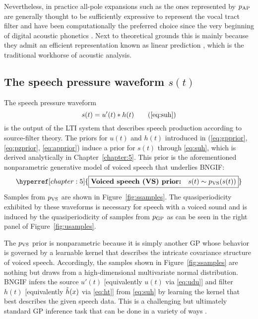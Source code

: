 \begin{chaptersections}
Nevertheless, in practice all-pole expansions such as the ones represented by $p_{\text{AP}}$ are generally thought to be sufficiently expressive to represent the vocal tract filter \citep{Flanagan1965,Fulop2011} and have been computationally the preferred choice since the very beginning of digital acoustic phonetics \citep{Atal1971}.
Next to theoretical grounds \citep{Titze2000} this is mainly because they admit an efficient representation known as linear prediction \citep[LP;][]{Markel1976}, which is the traditional workhorse of acoustic analysis.


\subsection{The speech pressure waveform $s(t)$}


The speech pressure waveform
\begin{equation}
	s(t) = u'(t) * h(t) \tag{\ref{eq:suh}}
\end{equation}
is the output of the LTI system that describes speech production according to source-filter theory.
The priors for $u(t)$ and $h(t)$ introduced in (\ref{eq:gpprior}, \ref{eq:pzprior}, \ref{eq:apprior}) induce a prior for $s(t)$ through \eqref{eq:suh}, which is derived analytically in Chapter~\ref{chapter:5}.
This prior is the aforementioned nonparametric generative model of voiced speech that underlies BNGIF:
\begin{equation}
	\hyperref[chapter:5]{\boxed{\textbf{Voiced speech (VS) prior:} \quad s(t) \sim \piVS(s(t))}} \label{eq:vsprior}
\end{equation}
Samples from $p_{\text{VS}}$ are shown in Figure~\ref{fig:ssamples}.
The quasiperiodicity exhibited by these waveforms is necessary for speech with a voiced sound and is induced by the quasiperiodicity of samples from $p_{\text{GP}}$ as can be seen in the right panel of Figure~\ref{fig:usamples}.

The $p_{\text{VS}}$ prior is nonparametric because it is simply another GP whose behavior is governed by a learnable kernel that describes the intricate covariance structure of voiced speech.
Accordingly, the samples shown in Figure~\ref{fig:ssamples} are nothing but draws from a high-dimensional multivariate normal distribution.
BNGIF infers the source $u'(t)$ [equivalently $u(t)$ via \eqref{eq:udu}] and filter $h(t)$ [equivalently $\tilde{h}(x)$ via \eqref{eq:ht}] from \eqref{eq:suh} by learning the kernel that best describes the given speech data.
This is a challenging but ultimately standard GP inference task that can be done in a variety of ways \citep{Frigola2015,Simpson2020}.


\end{chaptersections}
